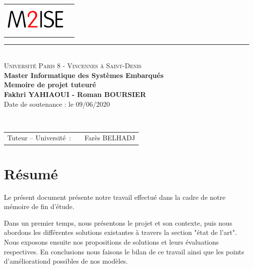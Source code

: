 \documentclass[a4paper, 12pt]{report}
\begin{document}
\begin{titlepage}
  \begin{center}
    \begin{tabular*}{\textwidth}{l@{\extracolsep{\fill}}r}
      \includegraphics[height=1.5cm]{images/m2ise.png}
    \end{tabular*}
    \small 
    \rule{\textwidth}{.5pt}~\\
    \large 
    \textsc{Université Paris 8 - Vincennes à Saint-Denis}\vspace{0.5cm}\\
    \textbf{Master Informatique des Systèmes Embarqués}\vspace{3.0cm}\\
    \Large
    \textbf{Memoire de projet tuteuré}\vspace{1.5cm}\\
    \large
    \textbf{Fakhri \textsc{YAHIAOUI} - Roman \textsc{BOURSIER}}\vspace{1.5cm}\\
    Date de soutenance : le 09/06/2020\vspace{1.75cm}\\
  \end{center}\vspace{1.5cm}~\\
  \begin{tabular}{ll}
    \hspace{-0.45cm}Tuteur -- Université~:~&~Farès \textsc{BELHADJ}\\
  \end{tabular}
\end{titlepage}
\chapter*{Résumé}

Le présent document présente notre travail effectué dans la cadre de notre mémoire de fin d'étude.

Dans un premier temps, nous présentons le projet et son contexte, puis nous abordons les différentes solutions existantes à travers la section "état de l'art". Nous exposons ensuite nos propositions de solutions et leurs évaluations respectives. En conclusions nous faisons le bilan de ce travail ainsi que les points d'améliorationd possibles de nos modèles.
\end{document}
